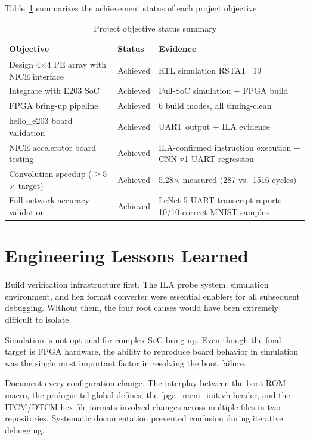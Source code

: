 Table~\ref{tab:5_1} summarizes the achievement status of each project objective.

\begin{table}[htbp]
\centering
\small
\caption{Project objective status summary}
\label{tab:5_1}
\begin{tabularx}{\textwidth}{l>{\centering\arraybackslash}p{2cm}X}
\hline
Objective & Status & Evidence \\ \hline\hline
Design 4$\times$4 PE array with NICE interface & Achieved & RTL simulation RSTAT=19 \\ \hline
Integrate with E203 SoC & Achieved & Full-SoC simulation + FPGA build \\ \hline
FPGA bring-up pipeline & Achieved & 6 build modes, all timing-clean \\ \hline
hello\_e203 board validation & Achieved & UART output + ILA evidence \\ \hline
NICE accelerator board testing & Achieved & ILA-confirmed instruction execution + CNN v1 UART regression \\ \hline
Convolution speedup ($\geq$5$\times$ target) & Achieved & 5.28$\times$ measured (287 vs.\ 1516 cycles) \\ \hline
Full-network accuracy validation & Achieved & LeNet-5 UART transcript reports 10/10 correct MNIST samples \\ \hline
\end{tabularx}
\end{table}

\section{Engineering Lessons Learned}\label{sec:5_4}

Build verification infrastructure first. The ILA probe system, simulation environment, and hex format converter were essential enablers for all subsequent debugging. Without them, the four root causes would have been extremely difficult to isolate.


Simulation is not optional for complex SoC bring-up. Even though the final target is FPGA hardware, the ability to reproduce board behavior in simulation was the single most important factor in resolving the boot failure.


Document every configuration change. The interplay between the boot-ROM macro, the prologue.tcl global defines, the fpga\_mem\_init.vh header, and the ITCM/DTCM hex file formats involved changes across multiple files in two repositories. Systematic documentation prevented confusion during iterative debugging.


